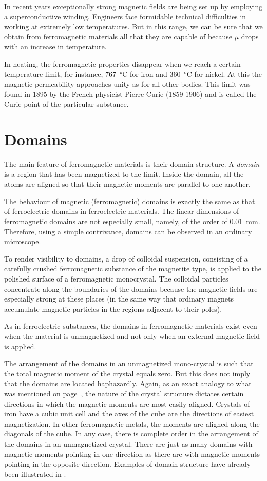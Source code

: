 In recent years exceptionally strong magnetic fields are being set up by employing a superconductive winding. Engineers face formidable technical difficulties in working at extremely low temperatures. But in this range, we can be sure that we obtain from ferromagnetic materials all that they are capable of because $\mu$ drops with an increase in temperature.

In heating, the ferromagnetic properties disappear when we reach a certain temperature limit, for instance, \SI{767}{\celsius} for iron and \SI{360}{\celsius} for nickel. At this the magnetic permeability approaches unity as for all other bodies. This limit was found in 1895 by the French physicist Pierre Curie (1859-1906) and is called the Curie point of the particular substance.

\section{Domains}

The main feature of ferromagnetic materials is their domain structure. A \emph{domain} is a region that has been magnetized to the limit. Inside the domain, all the atoms are aligned so that their magnetic moments are parallel to one another.

The behaviour of magnetic (ferromagnetic) domains is exactly the same as that of ferroelectric domains in ferroelectric materials. The linear dimensions of ferromagnetic domains are not especially small, namely, of the order of \SI{0.01}{\milli\meter}. Therefore, using a simple contrivance, domains can be observed in an ordinary microscope.

To render visibility to domains, a drop of colloidal suspension, consisting of a carefully crushed ferromagnetic substance of the magnetite type, is applied to the polished surface of a ferromagnetic monocrystal. The colloidal particles concentrate along the boundaries of the domains because the magnetic fields are especially strong at these places (in the same way that ordinary magnets accumulate magnetic particles in the regions adjacent to their poles).

As in ferroelectric substances, the domains in ferromagnetic materials exist even when the material is unmagnetized and not only when an external magnetic field is applied.

The arrangement of the domains in an unmagnetized mono-crystal is such that the total magnetic moment of the crystal equals zero. But this does not imply that the domains are located haphazardly. Again, as an exact analogy to what was mentioned on page~\pageref{fig-2.5}, the nature of the crystal structure dictates certain directions in which the magnetic moments are most easily aligned. Crystals of iron have a cubic unit cell and the axes of the cube are the directions of easiest magnetization. In other ferromagnetic metals, the moments are aligned along the diagonals of the cube. In any case, there is complete order in the arrangement of the domains in an unmagnetized crystal. There are just as many domains with magnetic moments pointing in one direction as there are with magnetic moments pointing in the opposite direction. Examples of domain structure have already been illustrated in .

